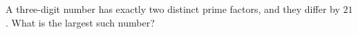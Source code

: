 A three-digit number has exactly two distinct prime factors, and they differ by $21$. What is the largest such number?
